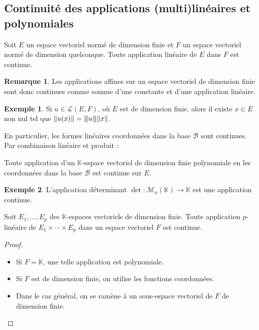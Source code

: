 \documentclass[french]{article}
\newcommand{\K}{\mathbb{K}}
\newcommand{\vertiii}[1]{{\left\vert\kern-0.25ex\left\vert\kern-0.25ex\left\vert #1 \right\vert\kern-0.25ex\right\vert\kern-0.25ex\right\vert}}
\theoremstyle{plain}
\theoremstyle{definition}
\newtheorem*{ex}{Exemple}
\newtheorem*{rmq}{Remarque}
\theoremstyle{remark}
\begin{document}
\subsection{Continuité des applications (multi)linéaires et polynomiales}

\begin{thm}%
	Soit $E$ un espace vectoriel normé de dimension finie et $F$ un espace vectoriel normé de dimension quelconque. Toute application linéaire de $E$ dans $F$ est continue.
\end{thm}

\begin{rmq}
	Les applications affines sur un espace vectoriel de dimension finie sont donc continues comme somme d'une constante et d'une application linéaire.
\end{rmq}

\begin{ex}
	Si $u\in\mathcal{L}(E,F)$, où $E$ est de dimension finie, alors il existe $x\in E$ non nul tel que $\lVert u(x)\rVert=\vertiii{u}\lVert x\rVert$. 
\end{ex}

En particulier, les formes linéaires coordonnées dans la base $\mathcal{B}$ sont continues. Par combinaison linéaire et produit :

\begin{prop}%
	Toute application d'un $\K$-espace vectoriel de dimension finie polynomiale en les coordonnées dans la base $\mathcal{B}$ est continue sur $E$.
\end{prop}

\begin{ex}
	L'application déterminant $\det:\mathcal{M}_n(\K)\to\K$ est une application continue.
\end{ex}

\begin{prop}%
	Soit $E_1,\ldots,E_p$ des $\K$-espaces vectoriels de dimension finie. Toute application $p$-linéaire de $E_1\times\cdots\times E_p$ dans un espace vectoriel $F$ est continue.
\end{prop}
\begin{proof}
	\begin{itemize}
		\item Si $F=\K$, une telle application est polynomiale.
		\item Si $F$ est de dimension finie, on utilise les fonctions coordonnées.
		\item Dans le cas général, on se ramène à un sous-espace vectoriel de $F$ de dimension finie.
	\end{itemize}
\end{proof}
\end{document}
